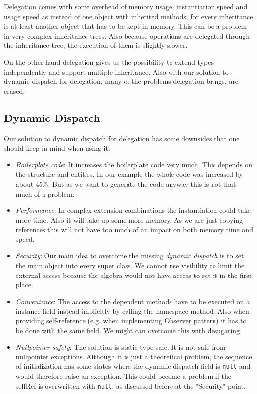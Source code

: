 \documentclass{report}
\begin{document}
Delegation comes with some overhead of memory usage, instantiation speed and usage speed as instead of one object with inherited methods, for every inheritance is at least another object that has to be kept in memory. This can be a problem in very complex inheritance trees. Also because operations are delegated through the inheritance tree, the execution of them is slightly slower.

On the other hand delegation gives us the possibility to extend types independently and support multiple inheritance. Also with our solution to dynamic dispatch for delegation, many of the problems delegation brings, are erased.

\subsection{Dynamic Dispatch}
\label{discussionDynamicDispatch}

Our solution to dynamic dispatch for delegation has some downsides that one should keep in mind when using it.
\begin{itemize}
  \item \emph{Boilerplate code}: It increases the boilerplate code very much. This depends on the structure and entities. In our example the whole code was increased by about 45\%. But as we want to generate the code anyway this is not that much of a problem.
  \item \emph{Performance}: In complex extension combinations the instantiation could take more time. Also it will take up some more memory. As we are just copying references this will not have too much of an impact on both memory time and speed.
  \item \emph{Security}: Our main idea to overcome the missing \emph{dynamic dispatch} is to set the main object into every super class. We cannot use visibility to limit the external access because the algebra would not have access to set it in the first place.
  \item \emph{Convenience}: The access to the dependent methods have to be executed on a instance field instead implicitly by calling the namespace-method. Also when providing self-reference (e.g. when implementing Observer pattern\cite{Gof-Design-1993}) it has to be done with the same field. We might can overcome this with desugaring.
  \item \emph{Nullpointer safety}: The solution is static type safe. It is not safe from nullpointer exceptions. Although it is just a theoretical problem, the sequence of initialization has some states where the dynamic dispatch field is \lstinline{null} and would therefore raise an exception. This could become a problem if the selfRef is overwritten with \lstinline{null}, as discussed before at the "Security"-point.
\end{itemize}
\end{document}
